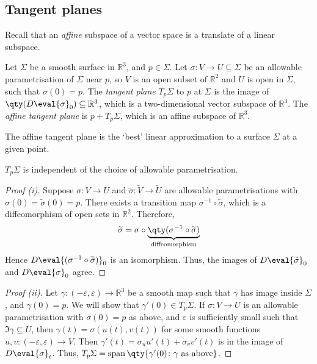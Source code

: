\subsection{Tangent planes}
Recall that an \textit{affine} subspace of a vector space is a translate of a linear subspace.
\begin{definition}
	Let $\Sigma$ be a smooth surface in $\mathbb R^3$, and $p \in \Sigma$.
	Let $\sigma \colon V \to U \subseteq \Sigma$ be an allowable parametrisation of $\Sigma$ near $p$, so $V$ is an open subset of $\mathbb R^2$ and $U$ is open in $\Sigma$, such that $\sigma(0) = p$.
	The \textit{tangent plane} $T_p \Sigma$ to $p$ at $\Sigma$ is the image of $\qty(D \eval{\sigma}_0) \subseteq \mathbb R^3$, which is a two-dimensional vector subspace of $\mathbb R^3$.
	The \textit{affine tangent plane} is $p + T_p \Sigma$, which is an affine subspace of $\mathbb R^3$.
\end{definition}
\begin{remark}
	The affine tangent plane is the `best' linear approximation to a surface $\Sigma$ at a given point.
\end{remark}
\begin{lemma}
	$T_p \Sigma$ is independent of the choice of allowable parametrisation.
\end{lemma}
\begin{proof}[Proof (i)]
	Suppose $\sigma \colon V \to U$ and $\widetilde \sigma \colon \widetilde V \to \widetilde U$ are allowable parametrisations with $\sigma(0) = \widetilde \sigma(0) = p$.
	There exists a transition map $\sigma^{-1} \circ \widetilde \sigma$, which is a diffeomorphism of open sets in $\mathbb R^2$.
	Therefore,
	\begin{align*}
		\widetilde \sigma = \sigma \circ \underbrace{\qty(\sigma^{-1} \circ \widetilde \sigma)}_{\text{diffeomorphism}}
	\end{align*}
	Hence $D\eval{(\sigma^{-1} \circ \widetilde \sigma)}_{0}$ is an isomorphism.
	Thus, the images of $D \eval{\widetilde \sigma}_0$ and $D \eval{\sigma}_0$ agree.
\end{proof}
\begin{proof}[Proof (ii)]
	Let $\gamma \colon (-\varepsilon, \varepsilon) \to \mathbb R^3$ be a smooth map such that $\gamma$ has image inside $\Sigma$, and $\gamma(0) = p$.
	We will show that $\gamma'(0) \in T_p \Sigma$.
	If $\sigma \colon V \to U$ is an allowable parametrisation with $\sigma(0) = p$ as above, and $\varepsilon$ is sufficiently small such that $\Im \gamma \subseteq U$, then $\gamma(t) = \sigma(u(t), v(t))$ for some smooth functions $u, v \colon (-\varepsilon, \varepsilon) \to V$.
	Then $\gamma'(t) = \sigma_u u'(t) + \sigma_v v'(t)$ is in the image of $D \eval{\sigma}_t$.
	Thus, $T_p \Sigma = \vecspan \qty{ \gamma'(0) \colon \gamma \text{ as above} }$.
\end{proof}
